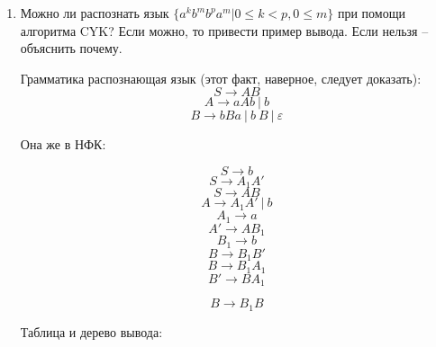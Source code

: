 \documentclass[12pt]{article}
\begin{document}
\bigskip
\begin{enumerate}
 \item Можно ли распознать язык $\{a^kb^mb^pa^m | 0 \leq k < p, 0 \leq m\}$ при помощи алгоритма CYK? 
    Если можно, то привести пример вывода.
    Если нельзя -- объяснить почему.

        Грамматика распознающая язык (этот факт, наверное, следует доказать):
        \[
            S \rightarrow A B
        \]
        \[
            A \rightarrow a A b~|~b
        \]
        \[
            B \rightarrow b B a~|~b~B~|~\varepsilon
        \]

        Она же в НФК:

        \[
            S \rightarrow b
        \]
        \[
            S \rightarrow A_1 A'
        \]
        \[
            S \rightarrow A B
        \]
        \[
            A \rightarrow  A_1 A'~|~b
        \]
        \[
            A_1 \rightarrow a
        \]
        \[
            A' \rightarrow A B_1
        \]
        \[
            B_1 \rightarrow b
        \]
        \[
            B \rightarrow B_1 B'
        \]
        \[
            B \rightarrow B_1 A_1
        \]
        \[
            B' \rightarrow B A_1
        \]

        \[
            B \rightarrow B_1 B
        \]

        Таблица и дерево вывода:


\end{enumerate}
\end{document}
